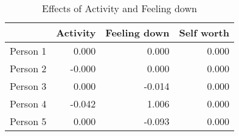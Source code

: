 \begin{table}[ht]
\centering
\begin{tabular}{rrrr}
  \toprule
 & Activity & Feeling down & Self worth \\ 
  \midrule
Person 1 & 0.000 & 0.000 & 0.000 \\ 
  Person 2 & -0.000 & 0.000 & 0.000 \\ 
  Person 3 & 0.000 & -0.014 & 0.000 \\ 
  Person 4 & -0.042 & 1.006 & 0.000 \\ 
  Person 5 & 0.000 & -0.093 & 0.000 \\ 
   \bottomrule
\end{tabular}
\caption{Effects of Activity and Feeling down} 
\label{tab:effects_in_aira}
\end{table}
